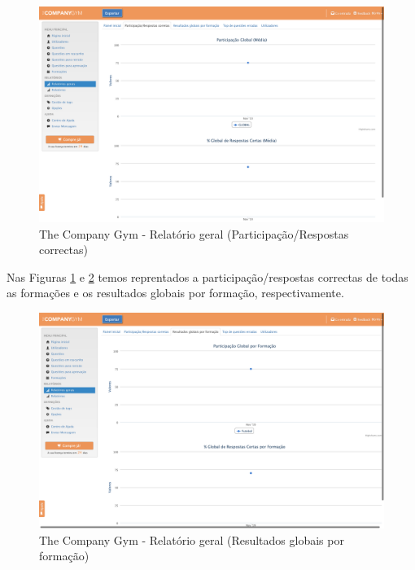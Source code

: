 \newpage

\begin{figure}[ht!]
	\begin{center}
		\includegraphics[width=1\textwidth]{img/tcg/tcg-data1.png}
		\caption{The Company Gym - Relatório geral (Participação/Respostas correctas)}
		\label{fig:tcg-data1}
	\end{center}
\end{figure}

Nas Figuras \ref{fig:tcg-data1} e \ref{fig:tcg-data2} temos reprentados a participação/respostas correctas de todas as formações e os resultados globais por formação, respectivamente.

\begin{figure}[ht!]
	\begin{center}
		\includegraphics[width=1\textwidth]{img/tcg/tcg-data2.png}
		\caption{The Company Gym - Relatório geral (Resultados globais por formação)}
		\label{fig:tcg-data2}
	\end{center}
\end{figure}

